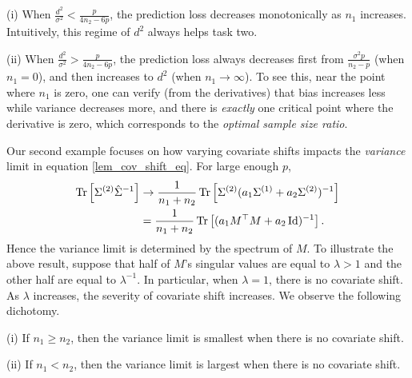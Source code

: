 (i) When $\frac{d^2}{\sigma^2} < \frac{p}{4n_2 - 6p}$, the prediction loss decreases monotonically as $n_1$ increases.
	Intuitively, this regime of $d^2$ always helps task two.

(ii) When $\frac{d^2}{\sigma^2} > \frac{p}{4n_2 - 6p}$, the prediction loss always decreases first from $\frac{\sigma^2 p}{n_2 - p}$ (when $n_1 = 0$), and then increases to $d^2$ (when $n_1 \rightarrow \infty$).
	To see this, near the point where $n_1$ is zero, one can verify (from the derivatives) that bias increases less while variance decreases more, and there is \textit{exactly} one critical point where the derivative is zero, which corresponds to the \textit{optimal sample size ratio}.

\begin{example}\label{ex_covshift}
Our second example focuses on how varying covariate shifts impacts the \textit{variance} limit in equation \eqref{lem_cov_shift_eq}. For large enough $p$,
\begin{align*}
	\operatorname{Tr}\left[\Sigma^{(2)} \hat{\Sigma}^{-1}\right] &\rightarrow \frac{1}{n_1 + n_2} \operatorname{Tr}\left[\Sigma^{(2)} (a_1 \Sigma^{(1)} + a_2 \Sigma^{(2)})^{-1}\right] \\
	&= \frac{1}{n_1 + n_2} \operatorname{Tr}\left[(a_1 M^{\top} M + a_2 \operatorname{Id})^{-1}\right].
\end{align*}
Hence the variance limit is determined by the spectrum of $M$. %
To illustrate the above result, suppose that half of $M$'s singular values are equal to $\lambda > 1$ and the other half are equal to $\lambda^{-1}$.
In particular, when $\lambda = 1$, there is no covariate shift.
As $\lambda$ increases, the severity of covariate shift increases.
We observe the following dichotomy.

(i) If $n_1 \ge n_2$, then the variance limit is smallest when there is no covariate shift.

(ii) If $n_1 < n_2$, then the variance limit is largest when there is no covariate shift.
\end{example}

